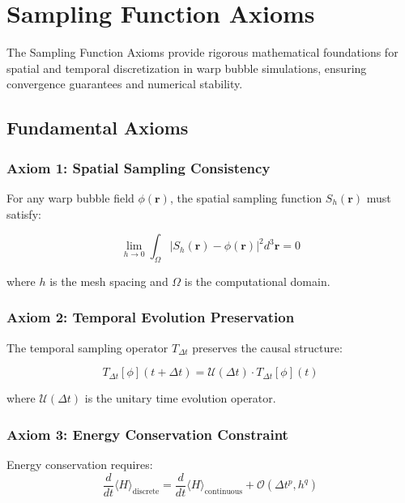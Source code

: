 \section{Sampling Function Axioms}
\label{sec:sampling_axioms}

The Sampling Function Axioms provide rigorous mathematical foundations for spatial and temporal discretization in warp bubble simulations, ensuring convergence guarantees and numerical stability.

\subsection{Fundamental Axioms}

\subsubsection{Axiom 1: Spatial Sampling Consistency}

For any warp bubble field $\phi(\mathbf{r})$, the spatial sampling function $S_h(\mathbf{r})$ must satisfy:

\begin{equation}
\lim_{h \to 0} \int_{\Omega} |S_h(\mathbf{r}) - \phi(\mathbf{r})|^2 d^3\mathbf{r} = 0
\end{equation}

where $h$ is the mesh spacing and $\Omega$ is the computational domain.

\subsubsection{Axiom 2: Temporal Evolution Preservation}

The temporal sampling operator $T_{\Delta t}$ preserves the causal structure:

\begin{equation}
T_{\Delta t}[\phi](t + \Delta t) = \mathcal{U}(\Delta t) \cdot T_{\Delta t}[\phi](t)
\end{equation}

where $\mathcal{U}(\Delta t)$ is the unitary time evolution operator.

\subsubsection{Axiom 3: Energy Conservation Constraint}

Energy conservation requires:
\begin{equation}
\frac{d}{dt}\langle H \rangle_{\text{discrete}} = \frac{d}{dt}\langle H \rangle_{\text{continuous}} + \mathcal{O}(\Delta t^p, h^q)
\end{equation}

